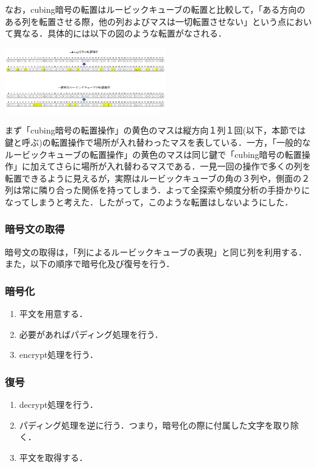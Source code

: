 \documentclass[a4p]{jarticle}
\begin{document}
なお，cubing暗号の転置はルービックキューブの転置と比較して，「ある方向のある列を転置させる際，他の列およびマスは一切転置させない」という点において異なる．具体的には以下の図のような転置がなされる．\\
\begin{center}
  \includegraphics[width=7cm]{./tex_pic/trans.png}\\
\end{center}
まず「cubing暗号の転置操作」の黄色のマスは縦方向１列１回(以下，本節では鍵と呼ぶ)の転置操作で場所が入れ替わったマスを表している．一方，「一般的なルービックキューブの転置操作」の黄色のマスは同じ鍵で「cubing暗号の転置操作」に加えてさらに場所が入れ替わるマスである．一見一回の操作で多くの列を転置できるように見えるが，実際はルービックキューブの角の３列や，側面の２列は常に隣り合った関係を持ってしまう．よって全探索や頻度分析の手掛かりになってしまうと考えた．したがって，このような転置はしないようにした．

\subsubsection{暗号文の取得}
暗号文の取得は，「列によるルービックキューブの表現」と同じ列を利用する．\\

また，以下の順序で暗号化及び復号を行う．
\subsubsection{暗号化}
\begin{enumerate}
\item 平文を用意する．
\item 必要があればパディング処理を行う．
\item encrypt処理を行う．
\end{enumerate}

\subsubsection{復号}
\begin{enumerate}
\item decrypt処理を行う．
\item パディング処理を逆に行う．つまり，暗号化の際に付属した文字を取り除く．
\item 平文を取得する．
\end{enumerate}
\end{document}
